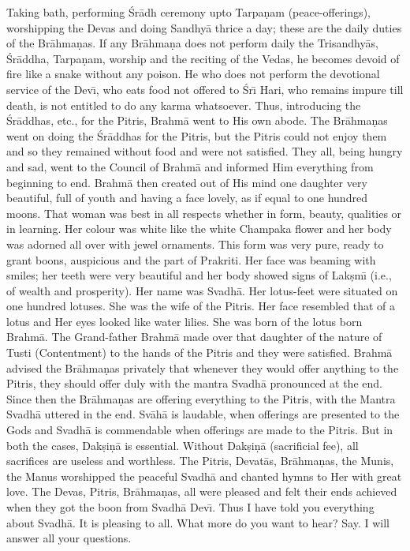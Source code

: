 Taking bath, performing \'Sr\=adh ceremony upto Tarpa\d{n}am (peace-offerings), worshipping the Devas and doing Sandhy\=a thrice a day; these are the daily duties of the Br\=ahma\d{n}as. If any Br\=ahma\d{n}a does not perform daily the Trisandhy\=as, \'Sr\=addha, Tarpa\d{n}am, worship and the reciting of the Vedas, he becomes devoid of fire like a snake without any poison. He who does not perform the devotional service of the Dev\={\i}, who eats food not offered to \'Sr\={\i} Hari, who remains impure till death, is not entitled to do any karma whatsoever. Thus, introducing the \'Sr\=addhas, etc., for the Pitris, Brahm\=a went to His own abode. The Br\=ahma\d{n}as went on doing the \'Sr\=addhas for the Pitris, but the Pitris could not enjoy them and so they remained without food and were not satisfied. They all, being hungry and sad, went to the Council of Brahm\=a and informed Him everything from beginning to end. Brahm\=a then created out of His mind one daughter very beautiful, full of youth and having a face lovely, as if equal to one hundred moons. That woman was best in all respects whether in form, beauty, qualities or in learning. Her colour was white like the white Champaka flower and her body was adorned all over with jewel ornaments. This form was very pure, ready to grant boons, auspicious and the part of Prakriti. Her face was beaming with smiles; her teeth were very beautiful and her body showed signs of Lak\d{s}m\={\i} (i.e., of wealth and prosperity). Her name was Svadh\=a. Her lotus-feet were situated on one hundred lotuses. She was the wife of the Pitris. Her face resembled that of a lotus and Her eyes looked like water lilies. She was born of the lotus born Brahm\=a. The Grand-father Brahm\=a made over that daughter of the nature of Tusti (Contentment) to the hands of the Pitris and they were satisfied. Brahm\=a advised the Br\=ahma\d{n}as privately that whenever they would offer anything to the Pitris, they should offer duly with the mantra Svadh\=a pronounced at the end. Since then the Br\=ahma\d{n}as are offering everything to the Pitris, with the Mantra Svadh\=a uttered in the end. Sv\=ah\=a is laudable, when offerings are presented to the Gods and Svadh\=a is commendable when offerings are made to the Pitris. But in both the cases, Dak\d{s}i\d{n}\=a is essential. Without Dak\d{s}i\d{n}\=a (sacrificial fee), all sacrifices are useless and worthless. The Pitris, Devat\=as, Br\=ahma\d{n}as, the Munis, the Manus worshipped the peaceful Svadh\=a and chanted hymns to Her with great love. The Devas, Pitris, Br\=ahma\d{n}as, all were pleased and felt their ends achieved when they got the boon from Svadh\=a Dev\={\i}. Thus I have told you everything about Svadh\=a. It is pleasing to all. What more do you want to hear? Say. I will answer all your questions.


